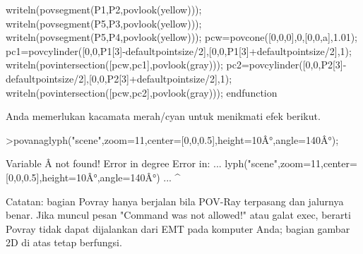 \documentclass[a4paper,10pt]{article}
\begin{document}
\begin{eulernotebook}
\begin{eulercomment}
\begin{eulercomment}
\begin{eulercomment}
\begin{eulercomment}
\begin{eulercomment}
\begin{eulercomment}
\begin{eulercomment}
\begin{eulercomment}
\begin{eulercomment}
\begin{eulercomment}
\begin{eulercomment}
\begin{eulercomment}
\begin{eulercomment}
\begin{eulercomment}
\begin{eulercomment}
\begin{eulercomment}
\begin{eulerudf}
  writeln(povsegment(P1,P2,povlook(yellow)));
  writeln(povsegment(P5,P3,povlook(yellow)));
  writeln(povsegment(P5,P4,povlook(yellow)));
  pcw=povcone([0,0,0],0,[0,0,a],1.01);
  pc1=povcylinder([0,0,P1[3]-defaultpointsize/2],[0,0,P1[3]+defaultpointsize/2],1);
  writeln(povintersection([pcw,pc1],povlook(gray)));
  pc2=povcylinder([0,0,P2[3]-defaultpointsize/2],[0,0,P2[3]+defaultpointsize/2],1);
  writeln(povintersection([pcw,pc2],povlook(gray)));
  endfunction
\end{eulerudf}
\begin{eulercomment}
Anda memerlukan kacamata merah/cyan untuk menikmati efek berikut.
\end{eulercomment}
\begin{eulerprompt}
>povanaglyph("scene",zoom=11,center=[0,0,0.5],height=10Â°,angle=140Â°);
\end{eulerprompt}
\begin{euleroutput}
  Variable Â not found!
  Error in degree
  Error in:
  ... lyph("scene",zoom=11,center=[0,0,0.5],height=10Â°,angle=140Â°) ...
                                                       ^
\end{euleroutput}
\begin{eulercomment}
Catatan: bagian Povray hanya berjalan bila POV-Ray terpasang dan jalurnya benar. Jika muncul
pesan "Command was not allowed!" atau galat exec, berarti Povray tidak dapat dijalankan dari
EMT pada komputer Anda; bagian gambar 2D di atas tetap berfungsi.


\end{eulercomment}
\end{eulercomment}
\end{eulercomment}
\end{eulercomment}
\end{eulercomment}
\end{eulercomment}
\end{eulercomment}
\end{eulercomment}
\end{eulercomment}
\end{eulercomment}
\end{eulercomment}
\end{eulercomment}
\end{eulercomment}
\end{eulercomment}
\end{eulercomment}
\end{eulercomment}
\end{eulercomment}
\end{eulernotebook}
\end{document}
